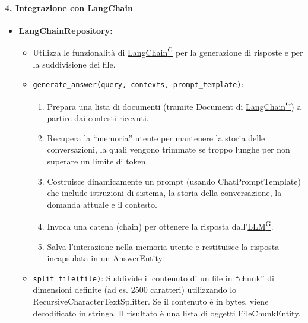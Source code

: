     \paragraph{4. Integrazione con LangChain}
    \begin{itemize}
        \item \textbf{LangChainRepository:}
        \begin{itemize}
            \item Utilizza le funzionalità di \href{https://code7crusaders.github.io/docs/PB/documentazione_interna/glossario.html#langchain}{LangChain\textsuperscript{G}} per la generazione di risposte e per la suddivisione dei file.
            \item \texttt{generate\_answer(query, contexts, prompt\_template)}:
            \begin{enumerate}
                \item Prepara una lista di documenti (tramite Document di \href{https://code7crusaders.github.io/docs/PB/documentazione_interna/glossario.html#langchain}{LangChain\textsuperscript{G}}) a partire dai contesti ricevuti.
                \item Recupera la “memoria” utente per mantenere la storia delle conversazioni, la quali vengono trimmate se troppo lunghe per non superare un limite di token.
                \item Costruisce dinamicamente un prompt (usando ChatPromptTemplate) che include istruzioni di sistema, la storia della conversazione, la domanda attuale e il contesto.
                \item Invoca una catena (chain) per ottenere la risposta dall’\href{https://code7crusaders.github.io/docs/PB/documentazione_interna/glossario.html#llm-large-language-model}{LLM\textsuperscript{G}}.
                \item Salva l’interazione nella memoria utente e restituisce la risposta incapsulata in un AnswerEntity.
            \end{enumerate}
            \item \texttt{split\_file(file)}: Suddivide il contenuto di un file in “chunk” di dimensioni definite (ad es. 2500 caratteri) utilizzando lo RecursiveCharacterTextSplitter. Se il contenuto è in bytes, viene decodificato in stringa. Il risultato è una lista di oggetti FileChunkEntity.
        \end{itemize}
    \end{itemize}

